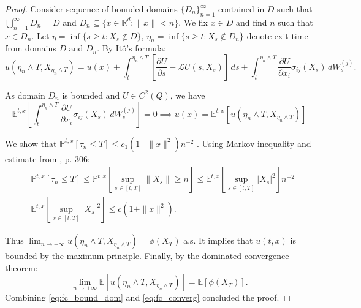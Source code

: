 \documentclass[pdftex,11pt,a4paper] {article}
\begin{document}
\begin{proof}
Consider sequence of bounded domains $\{D_n\}_{n=1}^{\infty}$ contained in $D$ such that $\bigcup\limits_{n=1}^{\infty} D_n=D$ and $D_n\subseteq \{x\in \mathbb{R}^d: \|x\|< n\}$. We fix $x\in D$ and find $n$ such that $x\in D_n$. Let
$\eta=\inf\{s\ge t: X_s\not\in D\}$, $\eta_n=\inf\{s\ge t: X_s\not\in D_n\}$ denote exit time from domains $D$ and $D_n$. By It\^{o}'s formula:
\begin{equation*}
u(\eta_n\wedge T, X_{\eta_n\wedge T})=u(x)+\int_t^{\eta_n\wedge T}\left[\frac{\partial U}{\partial s}-\mathcal{L}U(s,X_s)\right]\, ds + \int_t^{\eta_n\wedge T}\frac{\partial U}{\partial x_i}\sigma_{ij}(X_s)\,dW_s^{(j)}.
\end{equation*}

As domain $D_n$ is bounded and $U\in C^2(Q)$, we have
\begin{equation}\label{eq:fc_bound_dom}
\mathbb{E}^{t,x}\left[ \int_t^{\eta_n\wedge T}\frac{\partial U}{\partial x_i}\sigma_{ij}(X_s)\,dW_s^{(j)}\right]=0
\implies 
u(x)=\mathbb{E}^{t,x}\left[u(\eta_n\wedge T, X_{\eta_n\wedge T})\right]
\end{equation}

We show that $\mathbb{P}^{t,x}\left[\tau_n\le T\right]\le c_1(1+\|x\|^2)n^{-2}$
. Using Markov inequality and estimate from \cite{KaratzShre}, p. 306:
\begin{equation*}
\begin{split}
&\mathbb{P}^{t,x}\left[\tau_n\le T\right]\le \mathbb{P}^{t,x}\left[\sup_{s\in [t,T]}\|X_s\|\ge n\right]\le 
\mathbb{E}^{t,x}\left[\sup_{s\in [t,T]}|X_s|^2\right]n^{-2}\\
&\mathbb{E}^{t,x}\left[\sup_{s\in [t,T]}|X_s|^2\right]\le c\left(1+\|x\|^2\right).
\end{split}
\end{equation*}

Thus $\lim_{n\to +\infty}u(\eta_n\wedge T, X_{\eta_n\wedge T}) = \phi(X_T)$ a.s. 
It implies that $u(t,x)$ is bounded by the maximum principle. Finally, by the dominated convergence theorem:\vspace*{-0.5\baselineskip}
\begin{equation}\label{eq:fc_converg}
\lim_{n\to +\infty}\mathbb{E}\left[u(\eta_n\wedge T, X_{\eta_n\wedge T})\right] = \mathbb{E}\left[\phi(X_T)\right].
\end{equation}
Combining \eqref{eq:fc_bound_dom} and \eqref{eq:fc_converg} concluded the proof.
\end{proof}
\end{document}
